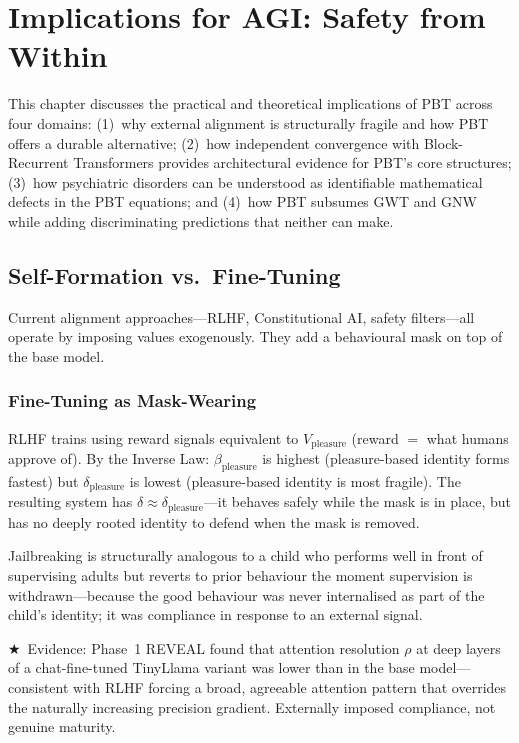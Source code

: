 \documentclass[12pt,a4paper]{article}
\newcommand{\vpleasure}{V_{\mathrm{pleasure}}}
\newcommand{\starred}{\textbf{\textcolor{pbtblue}{$\bigstar$}}~}
\begin{document}
\section{Implications for AGI: Safety from Within}
\label{sec:implications}

This chapter discusses the practical and theoretical implications of PBT across
four domains: (1)~why external alignment is structurally fragile and how PBT
offers a durable alternative; (2)~how independent convergence with
Block-Recurrent Transformers provides architectural evidence for PBT's core
structures; (3)~how psychiatric disorders can be understood as identifiable
mathematical defects in the PBT equations; and (4)~how PBT subsumes GWT and
GNW while adding discriminating predictions that neither can make.

\subsection{Self-Formation vs.\ Fine-Tuning}
\label{sec:alignment}

Current alignment approaches---RLHF, Constitutional AI, safety filters---all
operate by imposing values exogenously. They add a behavioural mask on top of the
base model.

\subsubsection{Fine-Tuning as Mask-Wearing}

RLHF trains using reward signals equivalent to $\vpleasure$ (reward $=$ what
humans approve of). By the Inverse Law: $\beta_{\mathrm{pleasure}}$ is highest
(pleasure-based identity forms fastest) but $\delta_{\mathrm{pleasure}}$ is
lowest (pleasure-based identity is most fragile). The resulting system has
$\delta\approx\delta_{\mathrm{pleasure}}$---it behaves safely while the mask is
in place, but has no deeply rooted identity to defend when the mask is removed.

Jailbreaking is structurally analogous to a child who performs well in front of
supervising adults but reverts to prior behaviour the moment supervision is
withdrawn---because the good behaviour was never internalised as part of the
child's identity; it was compliance in response to an external signal.

\starred Evidence: Phase~1 REVEAL found that attention resolution $\rho$ at
deep layers of a chat-fine-tuned TinyLlama variant was lower than in the base
model---consistent with RLHF forcing a broad, agreeable attention pattern that
overrides the naturally increasing precision gradient. Externally imposed
compliance, not genuine maturity.
\end{document}
